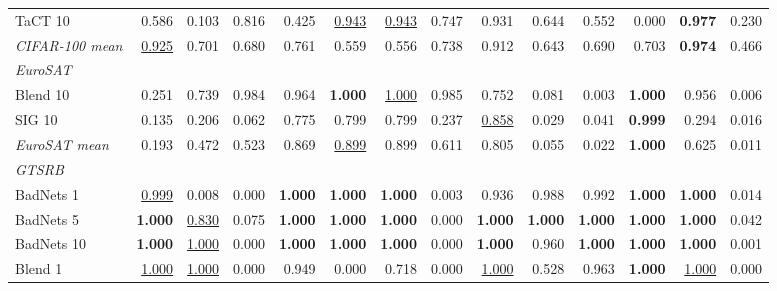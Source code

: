 \begin{table}[htbp]
\begin{adjustbox}{max width=\textwidth}
\begin{tabular}{lrrrrrrrrrrrrr}
TaCT 10 & 0.586 & \textcolor{black!45}{0.103} & 0.816 & \textcolor{black!45}{0.425} & \underline{0.943} & \underline{0.943} & 0.747 & 0.931 & 0.644 & 0.552 & \textcolor{black!45}{0.000} & \textbf{0.977} & \textcolor{black!45}{0.230} \\
\rowcolor{black!8}\emph{CIFAR-100 mean} & \underline{0.925} & 0.701 & 0.680 & 0.761 & 0.559 & 0.556 & 0.738 & 0.912 & 0.643 & 0.690 & 0.703 & \textbf{0.974} & \textcolor{black!45}{0.466} \\
\multicolumn{14}{l}{\emph{EuroSAT}} \\
Blend 10 & \textcolor{black!45}{0.251} & 0.739 & 0.984 & 0.964 & \textbf{1.000} & \underline{1.000} & 0.985 & 0.752 & \textcolor{black!45}{0.081} & \textcolor{black!45}{0.003} & \textbf{1.000} & 0.956 & \textcolor{black!45}{0.006} \\
SIG 10 & \textcolor{black!45}{0.135} & \textcolor{black!45}{0.206} & \textcolor{black!45}{0.062} & 0.775 & 0.799 & 0.799 & \textcolor{black!45}{0.237} & \underline{0.858} & \textcolor{black!45}{0.029} & \textcolor{black!45}{0.041} & \textbf{0.999} & \textcolor{black!45}{0.294} & \textcolor{black!45}{0.016} \\
\rowcolor{black!8}\emph{EuroSAT mean} & \textcolor{black!45}{0.193} & \textcolor{black!45}{0.472} & 0.523 & 0.869 & \underline{0.899} & 0.899 & 0.611 & 0.805 & \textcolor{black!45}{0.055} & \textcolor{black!45}{0.022} & \textbf{1.000} & 0.625 & \textcolor{black!45}{0.011} \\
\multicolumn{14}{l}{\emph{GTSRB}} \\
BadNets 1 & \underline{0.999} & \textcolor{black!45}{0.008} & \textcolor{black!45}{0.000} & \textbf{1.000} & \textbf{1.000} & \textbf{1.000} & \textcolor{black!45}{0.003} & 0.936 & 0.988 & 0.992 & \textbf{1.000} & \textbf{1.000} & \textcolor{black!45}{0.014} \\
BadNets 5 & \textbf{1.000} & \underline{0.830} & \textcolor{black!45}{0.075} & \textbf{1.000} & \textbf{1.000} & \textbf{1.000} & \textcolor{black!45}{0.000} & \textbf{1.000} & \textbf{1.000} & \textbf{1.000} & \textbf{1.000} & \textbf{1.000} & \textcolor{black!45}{0.042} \\
BadNets 10 & \textbf{1.000} & \underline{1.000} & \textcolor{black!45}{0.000} & \textbf{1.000} & \textbf{1.000} & \textbf{1.000} & \textcolor{black!45}{0.000} & \textbf{1.000} & 0.960 & \textbf{1.000} & \textbf{1.000} & \textbf{1.000} & \textcolor{black!45}{0.001} \\
Blend 1 & \underline{1.000} & \underline{1.000} & \textcolor{black!45}{0.000} & 0.949 & \textcolor{black!45}{0.000} & 0.718 & \textcolor{black!45}{0.000} & \underline{1.000} & 0.528 & 0.963 & \textbf{1.000} & \underline{1.000} & \textcolor{black!45}{0.000} \\

\end{tabular}
\end{adjustbox}
\end{table}
